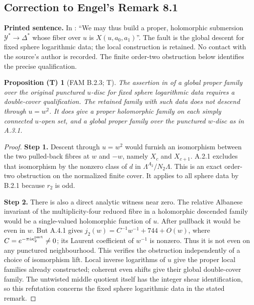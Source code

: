 \documentclass[11pt,a4paper]{article}
\theoremstyle{plain}
\newtheorem{proposition}[theorem]{Proposition (T)}
\theoremstyle{definition}
\newcommand{\uses}[1]{\par\noindent{\small\textsf{Uses:} #1}\par\smallskip}
\begin{document}
\subsection{Correction to Engel's Remark 8.1}
\noindent\textbf{Printed sentence.} In \cite[Remark 8.1]{E26}: ``We may thus build a proper, holomorphic submersion $\mathcal Y^*\to\Delta^*$ whose fiber over $u$ is $X(u,a_0,a_1)$''. The fault is the global descent for fixed sphere logarithmic data; the local construction is retained. No contact with the source's author is recorded. The finite order-two obstruction below identifies the precise qualification.
\begin{proposition}[FAM B.2.3; T]\label{fam:B.2.3}
The assertion in \cite[Remark 8.1]{E26} of a global proper family over the original punctured $u$-disc for fixed sphere logarithmic data requires a double-cover qualification. The retained family with such data does not descend through $u=w^2$. It does give a proper holomorphic family on each simply connected $u$-open set, and a global proper family over the punctured $w$-disc as in A.3.1.
\end{proposition}
\uses{FAM A.2.1, A.3.1, A.4.1 and B.2.1; \cite[Remark 8.1]{E26}.}
\begin{proof}
\par\smallskip\noindent\textbf{Step 1.} Descent through $u=w^2$ would furnish an isomorphism between the two pulled-back fibres at $w$ and $-w$, namely $X_c$ and $X_{c+1}$. A.2.1 excludes that isomorphism by the nonzero class of $d$ in $\Lambda^{A_2}/N_2\Lambda$. This is an exact order-two obstruction on the normalized finite cover. It applies to all sphere data by B.2.1 because $r_2$ is odd.

\par\smallskip\noindent\textbf{Step 2.} There is also a direct analytic witness near zero. The relative Albanese invariant of the multiplicity-four reduced fibre in a holomorphic descended family would be a single-valued holomorphic function of $u$. After pullback it would be even in $w$. But A.4.1 gives $j_2(w)=C^{-1}w^{-1}+744+O(w)$, where $C=e^{-\pi i\kappa_2^{\rm part}}\ne0$; its Laurent coefficient of $w^{-1}$ is nonzero. Thus it is not even on any punctured neighbourhood. This verifies the obstruction independently of a choice of isomorphism lift. Local inverse logarithms of $u$ give the proper local families already constructed; coherent even shifts give their global double-cover family. The untwisted middle quotient itself has the integer shear identification, so this refutation concerns the fixed sphere logarithmic data in the stated remark.
\end{proof}
\end{document}
